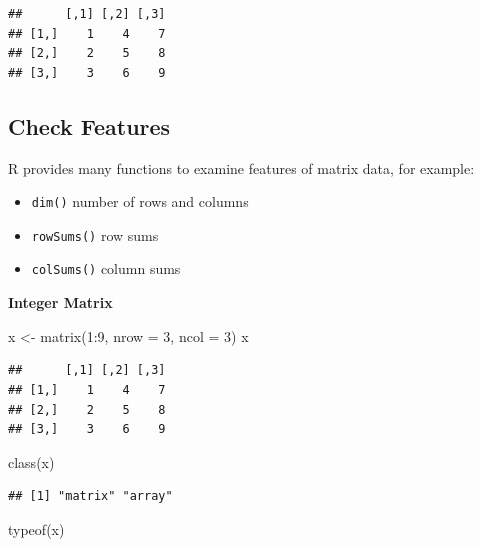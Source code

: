 \documentclass[
]{book}
\newenvironment{Shaded}{\begin{snugshade}}{\end{snugshade}}
\newcommand{\AttributeTok}[1]{\textcolor[rgb]{0.77,0.63,0.00}{#1}}
\newcommand{\DecValTok}[1]{\textcolor[rgb]{0.00,0.00,0.81}{#1}}
\newcommand{\FunctionTok}[1]{\textcolor[rgb]{0.00,0.00,0.00}{#1}}
\newcommand{\NormalTok}[1]{#1}
\newcommand{\OtherTok}[1]{\textcolor[rgb]{0.56,0.35,0.01}{#1}}
\newcommand{\SpecialCharTok}[1]{\textcolor[rgb]{0.00,0.00,0.00}{#1}}
\providecommand{\tightlist}{%
  \setlength{\itemsep}{0pt}\setlength{\parskip}{0pt}}
\begin{document}
\begin{verbatim}
##      [,1] [,2] [,3]
## [1,]    1    4    7
## [2,]    2    5    8
## [3,]    3    6    9
\end{verbatim}

\hypertarget{check-features-1}{%
\subsection{Check Features}\label{check-features-1}}

R provides many functions to examine features of matrix data, for example:

\begin{itemize}
\tightlist
\item
  \texttt{dim()} number of rows and columns
\item
  \texttt{rowSums()} row sums
\item
  \texttt{colSums()} column sums
\end{itemize}

\textbf{Integer Matrix}

\begin{Shaded}
\begin{Highlighting}[]
\NormalTok{x }\OtherTok{\textless{}{-}} \FunctionTok{matrix}\NormalTok{(}\DecValTok{1}\SpecialCharTok{:}\DecValTok{9}\NormalTok{, }\AttributeTok{nrow =} \DecValTok{3}\NormalTok{, }\AttributeTok{ncol =} \DecValTok{3}\NormalTok{)}
\NormalTok{x}
\end{Highlighting}
\end{Shaded}

\begin{verbatim}
##      [,1] [,2] [,3]
## [1,]    1    4    7
## [2,]    2    5    8
## [3,]    3    6    9
\end{verbatim}

\begin{Shaded}
\begin{Highlighting}[]
\FunctionTok{class}\NormalTok{(x)}
\end{Highlighting}
\end{Shaded}

\begin{verbatim}
## [1] "matrix" "array"
\end{verbatim}

\begin{Shaded}
\begin{Highlighting}[]
\FunctionTok{typeof}\NormalTok{(x)}
\end{Highlighting}
\end{Shaded}
\end{document}
